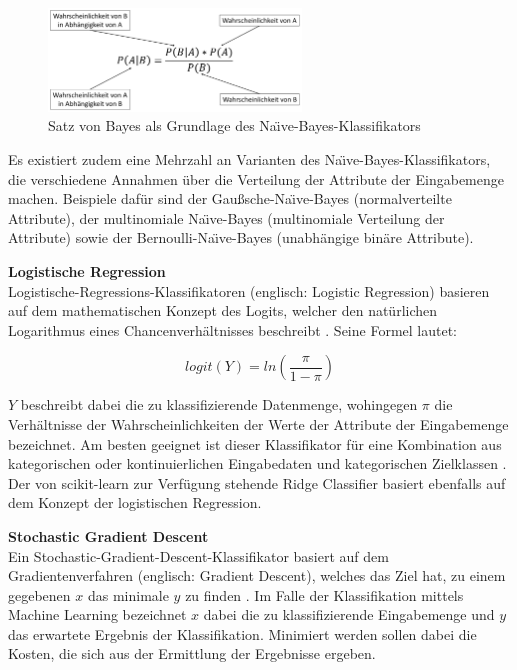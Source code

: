 \begin{figure}[t]
    \centering
    \includegraphics[width=0.6\textwidth]{images/NB}
    \caption{Satz von Bayes als Grundlage des Na\"{\i}ve-Bayes-Klassifikators\label{fig:nb}}
\end{figure}

Es existiert zudem eine Mehrzahl an Varianten des Na\"{\i}ve-Bayes-Klassifikators, die verschiedene Annahmen über die Verteilung der Attribute der Eingabemenge machen. Beispiele dafür sind der Gaußsche-Na\"{\i}ve-Bayes (normalverteilte Attribute), der multinomiale Na\"{\i}ve-Bayes (multinomiale Verteilung der Attribute) sowie der Bernoulli-Na\"{\i}ve-Bayes (unabhängige binäre Attribute).

\textbf{Logistische Regression\medskip}\\
Logistische-Regressions-Klassifikatoren (englisch: Logistic Regression) basieren auf dem mathematischen Konzept des Logits, welcher den natürlichen Logarithmus eines Chancenverhältnisses beschreibt \cite{Peng2002}. Seine Formel lautet:

\[logit(Y) = ln(\frac{\pi}{1-\pi})\]

$Y$ beschreibt dabei die zu klassifizierende Datenmenge, wohingegen $\pi$ die Verhältnisse der Wahrscheinlichkeiten der Werte der Attribute der Eingabemenge bezeichnet. Am besten geeignet ist dieser Klassifikator für eine Kombination aus kategorischen oder kontinuierlichen Eingabedaten und kategorischen Zielklassen \cite{Peng2002}. Der von scikit-learn zur Verfügung stehende Ridge Classifier basiert ebenfalls auf dem Konzept der logistischen Regression.

\textbf{Stochastic Gradient Descent\medskip}\\
Ein Stochastic-Gradient-Descent-Klassifikator basiert auf dem Gradientenverfahren (englisch: Gradient Descent), welches das Ziel hat, zu einem gegebenen $x$ das minimale $y$ zu finden \cite{Srinivasan2019}. Im Falle der Klassifikation mittels Machine Learning bezeichnet $x$ dabei die zu klassifizierende Eingabemenge und $y$ das erwartete Ergebnis der Klassifikation. Minimiert werden sollen dabei die \glqq Kosten\grqq{}, die sich aus der Ermittlung der Ergebnisse ergeben.

